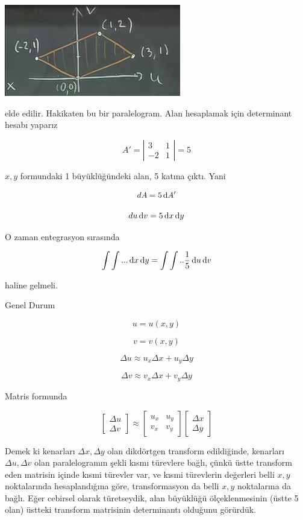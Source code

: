 \documentclass[12pt,fleqn]{article}\usepackage{../../common}
\begin{document}
\includegraphics[height=4cm]{18_5.png}

elde edilir. Hakikaten bu bir paralelogram. Alan hesaplamak için
determinant hesabı yaparız

$$ A' = 
\left|\begin{array}{rr}
3 & 1 \\
-2 & 1
\end{array}\right| = 5
 $$

$x,y$ formundaki 1 büyüklüğündeki alan, 5 katına çıktı. Yani 

$$ dA = 5 \,\mathrm{d} A' $$

$$ du \,\mathrm{d} v = 5 \,\mathrm{d} x \,\mathrm{d} y $$

O zaman entegrasyon sırasında 

$$ \int \int ... \,\mathrm{d} x \,\mathrm{d} y = \int \int ..  \frac{1}{5} \,\mathrm{d} u \,\mathrm{d} v $$

haline gelmeli. 

Genel Durum 

$$ u = u(x,y) $$

$$ v = v(x,y)  $$

$$ \Delta u \approx u_x \Delta x + u_y \Delta y  $$

$$ \Delta v \approx v_x \Delta x + v_y \Delta y  $$

Matris formunda 

$$ 
\left[\begin{array}{r}
\Delta u \\
\Delta v 
\end{array}\right] \approx 
\left[\begin{array}{rr}
u_x & u_y \\
v_x & v_y
\end{array}\right] 
\left[\begin{array}{r}
\Delta x \\
\Delta y 
\end{array}\right] 
$$

Demek ki kenarları $\Delta x,\Delta y$ olan dikdörtgen transform edildiğinde,
kenarları $\Delta u,\Delta v$ olan paralelogramın şekli kısmı türevlere bağlı,
çünkü üstte transform eden matrisin içinde kısmi türevler var, ve kısmi
türevlerin değerleri belli $x,y$ noktalarında hesaplandığına göre,
transformasyon da belli $x,y$ noktalarına da bağlı. Eğer cebirsel olarak
türetseydik, alan büyüklüğü ölçeklenmesinin (üstte 5 olan) üstteki transform
matrisinin determinantı olduğunu görürdük.
\end{document}
